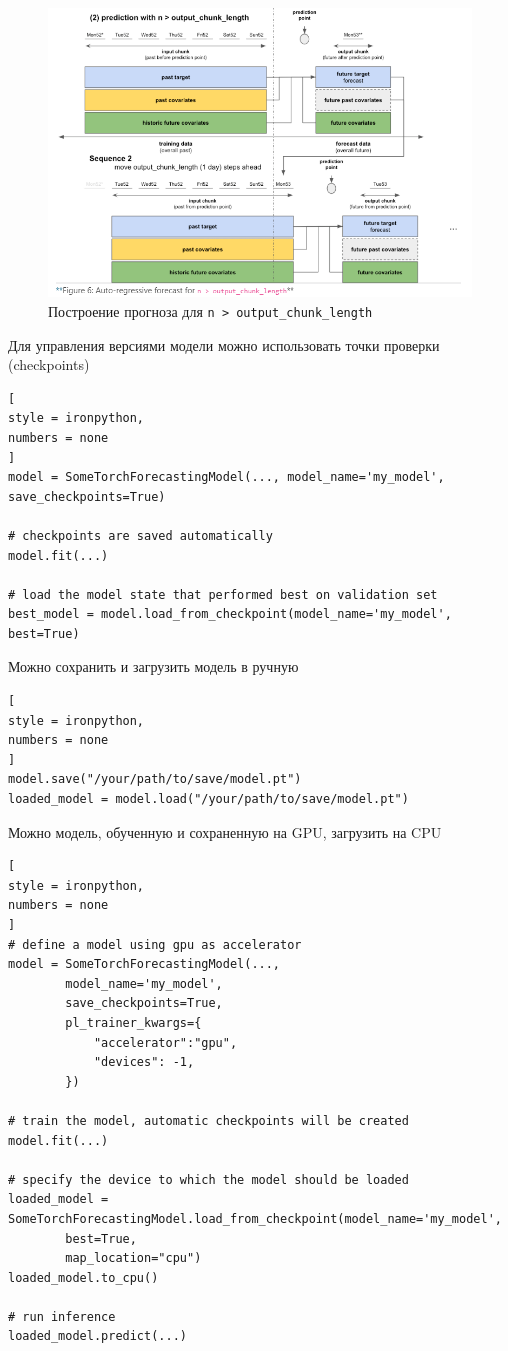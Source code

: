 \documentclass[%
	11pt,
	a4paper,
	utf8,
		]{article}
\begin{document}
\begin{figure}[h]
	\centering
	\includegraphics[scale=0.9 ]{figures/n_gt_output.png}
	\caption{ Построение прогноза для \texttt{n > output\_chunk\_length} }\label{fig:n_gt_output}
\end{figure}

Для управления версиями модели можно использовать точки проверки (checkpoints)
\begin{lstlisting}[
style = ironpython,
numbers = none
]
model = SomeTorchForecastingModel(..., model_name='my_model', save_checkpoints=True)

# checkpoints are saved automatically
model.fit(...)

# load the model state that performed best on validation set
best_model = model.load_from_checkpoint(model_name='my_model', best=True)
\end{lstlisting}

Можно сохранить и загрузить модель в ручную
\begin{lstlisting}[
style = ironpython,
numbers = none	
]
model.save("/your/path/to/save/model.pt")
loaded_model = model.load("/your/path/to/save/model.pt")
\end{lstlisting}

Можно модель, обученную и сохраненную на GPU, загрузить на CPU
\begin{lstlisting}[
style = ironpython,
numbers = none
]
# define a model using gpu as accelerator
model = SomeTorchForecastingModel(...,
		model_name='my_model',
		save_checkpoints=True,
		pl_trainer_kwargs={
			"accelerator":"gpu",
			"devices": -1,
		})

# train the model, automatic checkpoints will be created
model.fit(...)

# specify the device to which the model should be loaded
loaded_model = SomeTorchForecastingModel.load_from_checkpoint(model_name='my_model',
		best=True,
		map_location="cpu")
loaded_model.to_cpu()

# run inference
loaded_model.predict(...)
\end{lstlisting}
\end{document}
